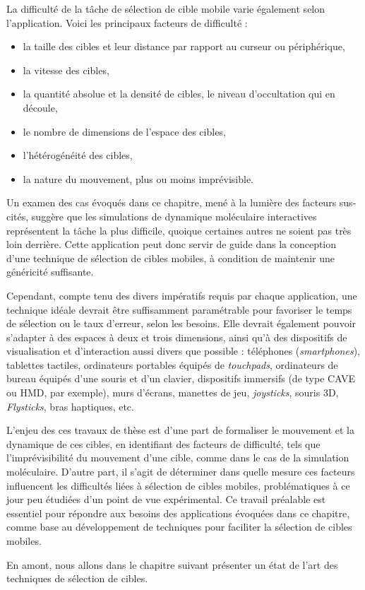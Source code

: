 	La difficulté de la tâche de sélection de cible mobile varie également selon l'application. Voici les principaux facteurs de difficulté :
	\begin{itemize}
		\item la taille des cibles et leur distance par rapport au \og curseur \fg{} ou périphérique,
		\item la vitesse des cibles,
		\item la quantité absolue et la densité de cibles, le niveau d'occultation qui en découle,
		\item le nombre de dimensions de l'espace des cibles,
		\item l'hétérogénéité des cibles,
		\item la nature du mouvement, plus ou moins imprévisible.
	\end{itemize}
	
	Un examen des cas évoqués dans ce chapitre, mené à la lumière des facteurs sus-cités, suggère que les simulations de dynamique moléculaire interactives représentent la tâche la plus difficile, quoique certaines autres ne soient pas très loin derrière. Cette application peut donc servir de guide dans la conception d'une technique de sélection de cibles mobiles, à condition de maintenir une généricité suffisante.
	
	Cependant, compte tenu des divers impératifs requis par chaque application, une technique idéale devrait être suffisamment paramétrable pour favoriser le temps de sélection ou le taux d'erreur, selon les besoins. Elle devrait également pouvoir s'adapter à des espaces à deux et trois dimensions, ainsi qu'à des dispositifs de visualisation et d'interaction aussi divers que possible : téléphones (\emph{smartphones}), tablettes tactiles, ordinateurs portables équipés de \emph{touchpads}, ordinateurs de bureau équipés d'une souris et d'un clavier, dispositifs immersifs (de type CAVE ou HMD, par exemple), murs d'écrans, manettes de jeu, \emph{joysticks}, souris 3D, \emph{Flysticks}\footnotemark, bras haptiques, etc.
	
	
	L'enjeu des ces travaux de thèse est d'une part de formaliser le mouvement et la dynamique de ces cibles, en identifiant des facteurs de difficulté, tels que l'imprévisibilité du mouvement d'une cible, comme dans le cas de la simulation moléculaire. D'autre part, il s'agit de déterminer dans quelle mesure ces facteurs influencent les difficultés liées à sélection de cibles mobiles, problématiques à ce jour peu étudiées d'un point de vue expérimental. Ce travail préalable est essentiel pour répondre aux besoins des applications évoquées dans ce chapitre, comme base au développement de techniques pour faciliter la sélection de cibles mobiles.
	
	En amont, nous allons dans le chapitre suivant présenter un état de l'art des techniques de sélection de cibles.